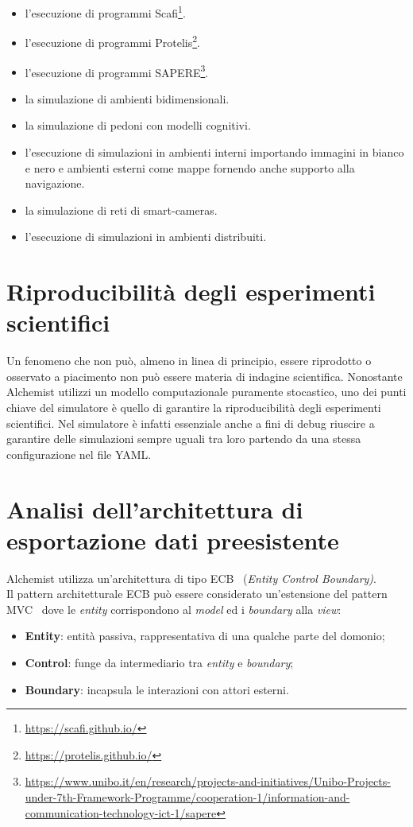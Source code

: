 \documentclass[12pt,a4paper,openright,oneside]{book}
\begin{document}
\begin{itemize}
    \item l'esecuzione di programmi Scafi\footnote{\url{https://scafi.github.io/}}.
    \item l'esecuzione di programmi Protelis\footnote{\url{https://protelis.github.io/}}.
    \item l'esecuzione di programmi SAPERE\footnote{\url{https://www.unibo.it/en/research/projects-and-initiatives/Unibo-Projects-under-7th-Framework-Programme/cooperation-1/information-and-communication-technology-ict-1/sapere}}.
    \item la simulazione di ambienti bidimensionali.
    \item la simulazione di pedoni con modelli cognitivi.
    \item l'esecuzione di simulazioni in ambienti interni importando immagini in bianco e nero e ambienti esterni come mappe fornendo anche supporto alla navigazione.
    \item la simulazione di reti di smart-cameras.
    \item l'esecuzione di simulazioni in ambienti distribuiti.
\end{itemize}
\section{Riproducibilità degli esperimenti scientifici}
Un fenomeno che non può, almeno in linea di principio, essere riprodotto o osservato a piacimento non può essere materia di indagine scientifica.
Nonostante Alchemist utilizzi un modello computazionale puramente stocastico, uno dei punti chiave del simulatore è quello di garantire la riproducibilità degli esperimenti scientifici.
Nel simulatore è infatti essenziale anche a fini di debug riuscire a garantire delle simulazioni sempre uguali tra loro partendo da una stessa configurazione nel file YAML.

\section{Analisi dell'architettura di esportazione dati preesistente}
Alchemist utilizza un'architettura di tipo ECB~\cite{ECB} (\textit{Entity Control Boundary)}.\\
Il pattern architetturale ECB può essere considerato un'estensione del pattern MVC~\cite{MVC} dove le \textit{entity} corrispondono al \textit{model} ed i \textit{boundary} alla \textit{view}:
\begin{itemize}
    \item \textbf{Entity}: entità passiva, rappresentativa di una qualche parte del domonio;
    \item \textbf{Control}: funge da intermediario tra \textit{entity} e \textit{boundary};
    \item \textbf{Boundary}: incapsula le interazioni con attori esterni.
\end{itemize}
\end{document}
